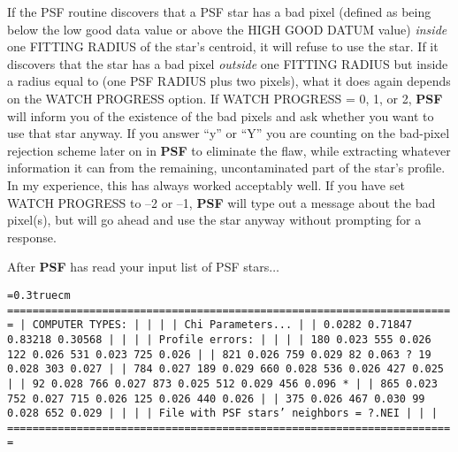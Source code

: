 If the PSF routine discovers that a PSF star has a bad pixel (defined
as being below the low good data value or above the HIGH GOOD DATUM
value) {\it inside\/} one FITTING RADIUS of the star's centroid, it
will refuse to use the star.  If it discovers that the star has a bad
pixel {\it outside\/} one FITTING RADIUS but inside a radius equal to
(one PSF RADIUS plus two pixels), what it does again depends on the
WATCH PROGRESS option.  If WATCH PROGRESS = 0, 1, or 2, {\bf PSF} will
inform you of the existence of the bad pixels and ask whether you want
to use that star anyway.  If you answer ``y'' or ``Y'' you are counting
on the bad-pixel rejection scheme later on in {\bf PSF} to eliminate
the flaw, while extracting whatever information it can from the
remaining, uncontaminated part of the star's profile.  In my
experience, this has always worked acceptably well.  If you have set
WATCH PROGRESS to --2 or --1, {\bf PSF} will type out a message about
the bad pixel(s), but will go ahead and use the star anyway without
prompting for a response.

After {\bf PSF} has read your input list of PSF stars$\ldots$

\vfill
\eject
{\noindent\obeylines\obeyspaces\frenchspacing\tt\baselineskip=0.3truecm
=======================================================================
| COMPUTER TYPES:                                                     |
|                                                                     |
|     Chi      Parameters...                                          |
|   0.0282    0.71847   0.83218   0.30568                             |
|                                                                     |
|  Profile errors:                                                    |
|                                                                     |
|   180 0.023    555 0.026    122 0.026    531 0.023    725 0.026     |
|   821 0.026    759 0.029     82 0.063 ?   19 0.028    303 0.027     |
|   784 0.027    189 0.029    660 0.028    536 0.026    427 0.025     |
|    92 0.028    766 0.027    873 0.025    512 0.029    456 0.096 *   |
|   865 0.023    752 0.027    715 0.026    125 0.026    440 0.026     |
|   375 0.026    467 0.030     99 0.028    652 0.029                  |
|                                                                     |
| File with PSF stars' neighbors = ?.NEI                              |
|                                                                     |
=======================================================================
}
\bigskip


